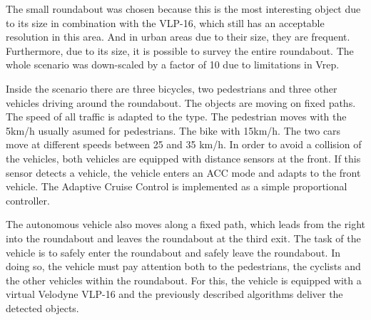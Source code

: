\documentclass[11pt,oneside,openright]{mpreport}
\begin{document}
The small roundabout was chosen because this is the most interesting object due to its size in combination with the VLP-16, which still has an acceptable resolution in this area.
And in urban areas due to their size, they are frequent. Furthermore, due to its size, it is possible to survey the entire roundabout. The whole scenario was down-scaled by a factor of 10 due to limitations in Vrep.


Inside the scenario there are three bicycles, two pedestrians and three other vehicles driving around the roundabout. The objects are moving on fixed paths.
The speed of all traffic is adapted to the type. The pedestrian moves with the 5km/h usually asumed for pedestrians.
The bike with 15km/h. The two cars move at different speeds between 25 and 35 km/h. In order to avoid a collision of the vehicles,
both vehicles are equipped with distance sensors at the front. If this sensor detects a vehicle, the vehicle enters an \acl{ACC} mode and adapts to the front vehicle.
The Adaptive Cruise Control is implemented as a simple proportional controller.


The autonomous vehicle also moves along a fixed path, which leads from the right into the roundabout and leaves the roundabout at the third exit. 
The task of the vehicle is to safely enter the roundabout and safely leave the roundabout. In doing so, the vehicle must pay attention both to the pedestrians,
the cyclists and the other vehicles within the roundabout. For this, the vehicle is equipped with a virtual Velodyne VLP-16 and the previously described algorithms deliver the detected objects.
\end{document}

